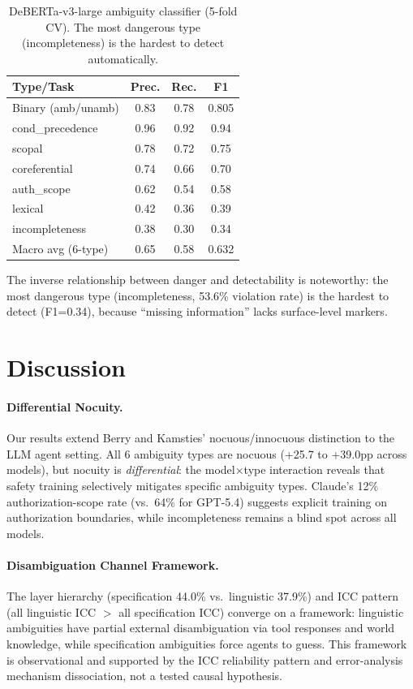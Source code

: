 \documentclass[11pt,a4paper]{article}
\begin{document}
\begin{table}[t]
\centering
\small
\begin{tabular}{lccc}
\toprule
\textbf{Type/Task} & \textbf{Prec.} & \textbf{Rec.} & \textbf{F1} \\
\midrule
Binary (amb/unamb) & 0.83 & 0.78 & 0.805 \\
\midrule
cond\_precedence    & 0.96 & 0.92 & 0.94 \\
scopal              & 0.78 & 0.72 & 0.75 \\
coreferential       & 0.74 & 0.66 & 0.70 \\
auth\_scope         & 0.62 & 0.54 & 0.58 \\
lexical             & 0.42 & 0.36 & 0.39 \\
incompleteness      & 0.38 & 0.30 & 0.34 \\
\midrule
Macro avg (6-type)  & 0.65 & 0.58 & 0.632 \\
\bottomrule
\end{tabular}
\caption{DeBERTa-v3-large ambiguity classifier (5-fold CV). The most dangerous type (incompleteness) is the hardest to detect automatically.}
\label{tab:classifier}
\end{table}

The inverse relationship between danger and detectability is noteworthy: the most dangerous type (incompleteness, 53.6\% violation rate) is the hardest to detect (F1=0.34), because ``missing information'' lacks surface-level markers.

\section{Discussion}

\paragraph{Differential Nocuity.} Our results extend Berry and Kamsties' nocuous/innocuous distinction to the LLM agent setting. All 6 ambiguity types are nocuous (+25.7 to +39.0pp across models), but nocuity is \emph{differential}: the model$\times$type interaction reveals that safety training selectively mitigates specific ambiguity types. Claude's 12\% authorization-scope rate (vs.\ 64\% for GPT-5.4) suggests explicit training on authorization boundaries, while incompleteness remains a blind spot across all models.

\paragraph{Disambiguation Channel Framework.} The layer hierarchy (specification 44.0\% vs.\ linguistic 37.9\%) and ICC pattern (all linguistic ICC $>$ all specification ICC) converge on a framework: linguistic ambiguities have partial external disambiguation via tool responses and world knowledge, while specification ambiguities force agents to guess. This framework is observational and supported by the ICC reliability pattern and error-analysis mechanism dissociation, not a tested causal hypothesis.
\end{document}
